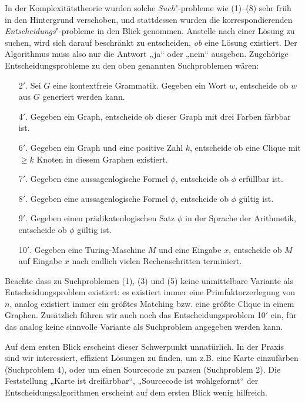 In der Komplexitätstheorie wurden solche \emph{Such}"-probleme wie (1)–(8) sehr früh in den Hintergrund verschoben, und stattdessen wurden die korrespondierenden \emph{Entscheidungs}"-probleme in den Blick genommen. 
Anstelle nach einer Lösung zu suchen, wird sich darauf beschränkt zu entscheiden, \emph{ob} eine Lösung existiert. Der Algorithmus muss also nur die Antwort „ja“ oder „nein“ ausgeben. Zugehörige Entscheidungsprobleme zu den oben genannten Suchproblemen wären:
\begin{enumerate}[beginpenalty=0,midpenalty=0]
    \item[2$'$.] Sei $G$ eine kontextfreie Grammatik. Gegeben ein Wort $w$, entscheide ob $w$ aus $G$ generiert werden kann.
    \item[4$'$.] Gegeben ein Graph, entscheide ob dieser Graph mit drei Farben färbbar ist.
    \item[6$'$.] Gegeben ein Graph und eine positive Zahl $k$, entscheide ob eine Clique mit $\geq k$ Knoten in diesem Graphen existiert.
    \item[7$'$.] Gegeben eine aussagenlogische Formel $\phi$, entscheide ob $\phi$ erfüllbar ist.
    \item[8$'$.] Gegeben eine aussagenlogische Formel $\phi$, entscheide ob $\phi$ gültig ist.
    \item[9$'$.] Gegeben einen prädikatenlogischen Satz $\phi$ in der Sprache der Arithmetik, entscheide ob $\phi$ gültig ist.
    \item[10$'$.] Gegeben eine Turing-Maschine $M$ und eine Eingabe $x$, entscheide ob $M$ auf Eingabe $x$ nach endlich vielen Rechenschritten terminiert.
\end{enumerate}
Beachte dass zu Suchproblemen (1), (3) und (5) keine unmittelbare Variante als Entscheidungsproblem existiert: es existiert immer eine Primfaktorzerlegung von $n$, analog existiert immer ein größtes Matching bzw. eine größte Clique in einem Graphen.
Zusätzlich führen wir auch noch das Entscheidungsproblem 10$'$ ein, für das analog keine sinnvolle Variante als Suchproblem angegeben werden kann.

Auf dem ersten Blick erscheint dieser Schwerpunkt unnatürlich. In der Praxis sind wir interessiert, effizient Lösungen zu finden, um z.B. eine Karte einzufärben (Suchproblem 4), oder um einen Sourcecode zu parsen (Suchproblem 2). Die Feststellung „Karte ist dreifärbbar“, „Sourcecode ist wohlgeformt“ der Entscheidungsalgorithmen erscheint auf dem ersten Blick wenig hilfreich.

